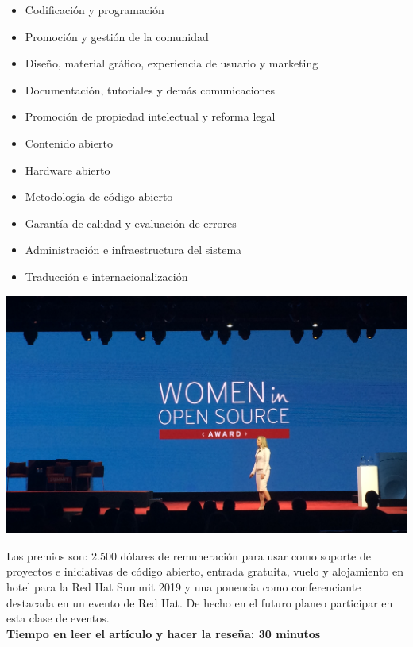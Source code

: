 \documentclass[a4paper, 11pt, oneside]{article}
\begin{document}
\begin{itemize}
    \item Codificación y programación
    \item Promoción y gestión de la comunidad
    \item Diseño, material gráfico, experiencia de usuario y marketing
    \item Documentación, tutoriales y demás comunicaciones
    \item Promoción de propiedad intelectual y reforma legal
    \item Contenido abierto
    \item Hardware abierto
    \item Metodología de código abierto
    \item Garantía de calidad y evaluación de errores
    \item Administración e infraestructura del sistema
    \item Traducción e internacionalización
\end{itemize}
    \begin{center}
        \includegraphics[scale=0.10]{wops.jpeg}
    \end{center}
Los premios son: 2.500 dólares de remuneración para usar como soporte de proyectos e iniciativas de código abierto, entrada gratuita, vuelo y alojamiento en hotel para la Red Hat Summit 2019 y
una ponencia como conferenciante destacada en un evento de Red Hat. De hecho en el futuro planeo participar en esta clase de eventos.\\
\textbf{Tiempo en leer el artículo y hacer la reseña: 30 minutos}

\end{document}
